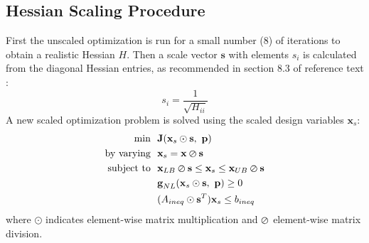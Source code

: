 \subsection{Hessian Scaling Procedure}\label{sec:appendix-scaling}
First the unscaled optimization is run for a small number (8) of iterations to obtain a realistic Hessian $H$.
Then a scale vector $\textbf{s}$ with elements $s_i$ is calculated from the diagonal Hessian entries, as recommended in section 8.3 of reference text \cite{papalambros_principles_2017}:
\begin{equation}
    s_i = \frac{1}{\sqrt{H_{ii}}}
\end{equation}
A new scaled optimization problem is solved using the scaled design variables $\textbf{x}_s$:
\begin{equation}
\begin{aligned}
    \text{min}~~& \textbf{J}(\textbf{x}_s \odot \textbf{s},~\textbf{p}) \\
    \text{by varying}~~&\textbf{x}_s= \textbf{x} \varoslash \textbf{s}\\
    \text{subject to}~~ &\textbf{x}_{LB}\varoslash \textbf{s} \leq \textbf{x}_s \leq \textbf{x}_{UB} \varoslash \textbf{s}\\
    &\textbf{g}_{NL}(\textbf{x}_s\odot\textbf{s},~\textbf{p}) \geq 0\\
    & (A_{ineq} \odot \textbf{s}^T)\textbf{x}_s \leq b_{ineq}
\label{standard}
\end{aligned}
\end{equation}
where $\odot$ indicates element-wise matrix multiplication and $\varoslash$ element-wise matrix division.

